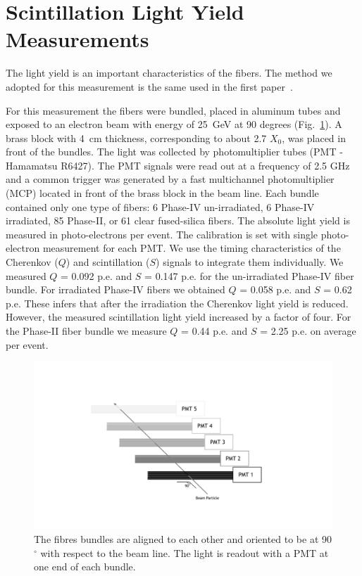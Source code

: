 \documentclass[a4paper,11pt]{article}
\begin{document}
\section{Scintillation Light Yield Measurements}
\label{sec:lightyield}
The light yield is an important characteristics of the fibers. The method we adopted for this measurement is the same used in the first paper~\cite{JINSTPaper}. 

For this measurement the fibers were bundled, placed in aluminum tubes and exposed to an electron beam with energy of 25~GeV at 90 degrees (Fig.~\ref{fig:bundles}). A brass block with 4~cm thickness, corresponding to about 2.7 $X_0$, was placed in front of the bundles. The light was collected by photomultiplier tubes (PMT - Hamamatsu R6427). The PMT signals were read out at a frequency of 2.5 GHz and a common trigger was generated by a fast multichannel photomultiplier (MCP) located in front of the brass block in the beam line. Each bundle contained only one type of fibers: 6 Phase-IV un-irradiated, 6 Phase-IV irradiated, 85 Phase-II, or 61 clear fused-silica fibers. The absolute light yield is measured in photo-electrons per event. The calibration is set with single photo-electron measurement for each PMT. We use the timing characteristics of the Cherenkov ($Q$) and scintillation ($S$) signals to integrate them individually. We measured $Q$ = 0.092 p.e. and $S$ = 0.147 p.e. for the un-irradiated Phase-IV fiber bundle. For irradiated Phase-IV fibers we obtained $Q$ = 0.058 p.e. and $S$ = 0.62 p.e. 
These infers that after the irradiation the Cherenkov light yield is reduced. However, the measured scintillation light yield increased by a factor of four. For the Phase-II fiber bundle we measure $Q$ = 0.44 p.e. and $S$ = 2.25 p.e. on average per event.
\begin{figure}[ht]
\begin{center}\vspace{-1pc}
      \includegraphics[width=15cm]{Figures/FiberBundles.pdf}
\caption{\small The fibres bundles are aligned to each other and oriented to be at 90$^\circ$ with respect to the beam line. The light is readout with a PMT at one end of each bundle.}
    \label{fig:bundles}
\end{center}
\end{figure}
\end{document}
